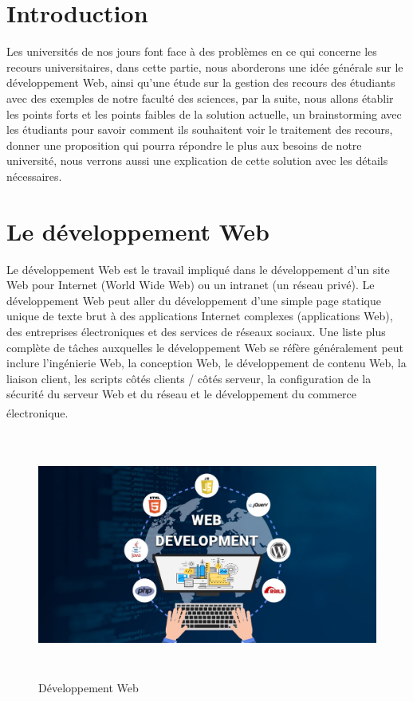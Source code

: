 \documentclass[12pt]{report}
\begin{document}
\section{Introduction}
\vspace{0.2in}
Les universités de nos jours font face à des problèmes en ce qui concerne les recours universitaires, dans cette partie, nous aborderons une idée générale sur le développement Web, ainsi qu'une étude sur la gestion des recours des étudiants avec des exemples de notre faculté des sciences, par la suite, nous allons établir les points forts et les points faibles de la solution actuelle, un brainstorming avec les étudiants pour savoir comment ils souhaitent voir le traitement des recours, donner une proposition  qui pourra répondre le plus aux besoins de notre université, nous verrons aussi une explication de cette solution avec les détails nécessaires.


\section{Le développement Web}
\vspace{0.2in}
Le développement Web est le travail impliqué dans le développement d'un site Web pour Internet (World Wide Web) ou un intranet (un réseau privé). Le développement Web peut aller du développement d'une simple page statique unique de texte brut à des applications Internet complexes (applications Web), des entreprises électroniques et des services de réseaux sociaux. Une liste plus complète de tâches auxquelles le développement Web se réfère généralement peut inclure l'ingénierie Web, la conception Web, le développement de contenu Web, la liaison client, les scripts côtés clients / côtés serveur, la configuration de la sécurité du serveur Web et du réseau et le développement du commerce électronique.\textsuperscript{\cite{berners2001semantic}}

\vspace{0.3in}

\begin{figure}[h]
\centering
    \includegraphics[width = 6in, height = 3.2in]{../Images/webDev.jpeg}
\caption{Développement Web}
\end{figure}
\end{document}
